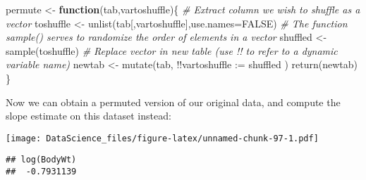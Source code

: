 \documentclass[
]{book}
\newenvironment{Shaded}{\begin{snugshade}}{\end{snugshade}}
\newcommand{\AttributeTok}[1]{\textcolor[rgb]{0.77,0.63,0.00}{#1}}
\newcommand{\CommentTok}[1]{\textcolor[rgb]{0.56,0.35,0.01}{\textit{#1}}}
\newcommand{\ConstantTok}[1]{\textcolor[rgb]{0.00,0.00,0.00}{#1}}
\newcommand{\ControlFlowTok}[1]{\textcolor[rgb]{0.13,0.29,0.53}{\textbf{#1}}}
\newcommand{\DecValTok}[1]{\textcolor[rgb]{0.00,0.00,0.81}{#1}}
\newcommand{\FunctionTok}[1]{\textcolor[rgb]{0.00,0.00,0.00}{#1}}
\newcommand{\NormalTok}[1]{#1}
\newcommand{\OtherTok}[1]{\textcolor[rgb]{0.56,0.35,0.01}{#1}}
\newcommand{\SpecialCharTok}[1]{\textcolor[rgb]{0.00,0.00,0.00}{#1}}
\newcommand{\StringTok}[1]{\textcolor[rgb]{0.31,0.60,0.02}{#1}}
\begin{document}
\begin{Shaded}
\begin{Highlighting}[]
\NormalTok{permute }\OtherTok{\textless{}{-}} \ControlFlowTok{function}\NormalTok{(tab,vartoshuffle)\{}
  \CommentTok{\# Extract column we wish to shuffle as a vector}
\NormalTok{  toshuffle }\OtherTok{\textless{}{-}} \FunctionTok{unlist}\NormalTok{(tab[,vartoshuffle],}\AttributeTok{use.names=}\ConstantTok{FALSE}\NormalTok{)}
  \CommentTok{\# The function sample() serves to randomize the order of elements in a vector}
\NormalTok{  shuffled }\OtherTok{\textless{}{-}} \FunctionTok{sample}\NormalTok{(toshuffle)}
  \CommentTok{\# Replace vector in new table (use !! to refer to a dynamic variable name)}
\NormalTok{  newtab }\OtherTok{\textless{}{-}} \FunctionTok{mutate}\NormalTok{(tab, }\SpecialCharTok{!!}\AttributeTok{vartoshuffle :=}\NormalTok{ shuffled )}
  \FunctionTok{return}\NormalTok{(newtab)}
\NormalTok{\}}
\end{Highlighting}
\end{Shaded}

Now we can obtain a permuted version of our original data, and compute the slope estimate on this dataset instead:

\begin{Shaded}
\end{Shaded}

\texttt{[image: DataScience\_files/figure-latex/unnamed-chunk-97-1.pdf]}

\begin{Shaded}
\end{Shaded}

\begin{verbatim}
## log(BodyWt) 
##  -0.7931139
\end{verbatim}
\end{document}
